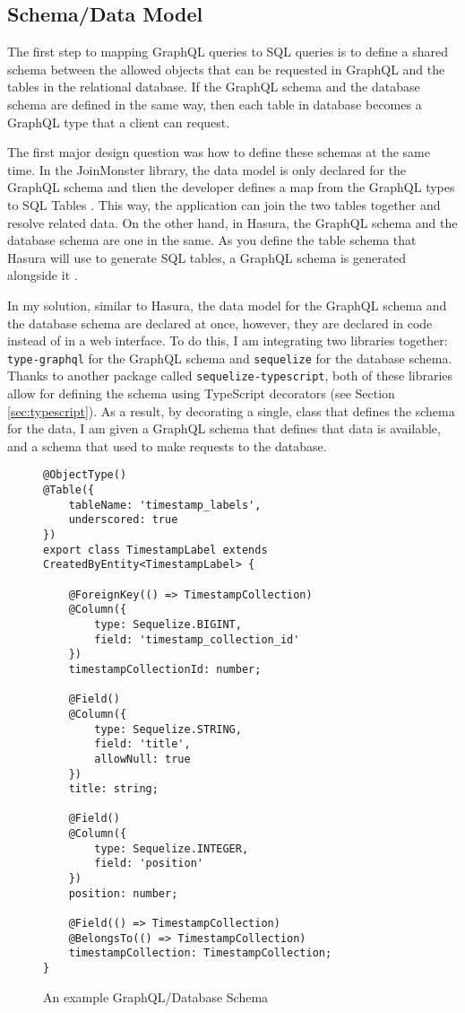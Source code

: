 \subsection{Schema/Data Model}

The first step to mapping GraphQL queries to SQL queries is to define a shared schema between the allowed objects that can be requested in GraphQL and the tables in the relational database.  If the GraphQL schema and the database schema are defined in the same way, then each table in database becomes a GraphQL type that a client can request.

The first major design question was how to define these schemas at the same time.  In the JoinMonster library, the data model is only declared for the GraphQL schema and then the developer defines a map from the GraphQL types to SQL Tables \cite{carlJoinMonster}.  This way, the application can join the two tables together and resolve related data.  On the other hand, in Hasura, the GraphQL schema and the database schema are one in the same.  As you define the table schema that Hasura will use to generate SQL tables, a GraphQL schema is generated alongside it \cite{hasurainc.HasuraGraphQLEngine}.

In my solution, similar to Hasura, the data model for the GraphQL schema and the database schema are declared at once, however, they are declared in code instead of in a web interface.  To do this, I am integrating two libraries together: \Verb!type-graphql! for the GraphQL schema and \Verb!sequelize! for the database schema.  Thanks to another package called \Verb!sequelize-typescript!, both of these libraries allow for defining the schema using TypeScript decorators (see Section \ref{sec:typescript}).  As a result, by decorating a single, class that defines the schema for the data, I am given a GraphQL schema that defines that data is available, and a schema that used to make requests to the database.

\begin{figure}
    \begin{verbatim}
@ObjectType()
@Table({
    tableName: 'timestamp_labels',
    underscored: true
})
export class TimestampLabel extends CreatedByEntity<TimestampLabel> {

    @ForeignKey(() => TimestampCollection)
    @Column({
        type: Sequelize.BIGINT,
        field: 'timestamp_collection_id'
    })
    timestampCollectionId: number;

    @Field()
    @Column({
        type: Sequelize.STRING,
        field: 'title',
        allowNull: true
    })
    title: string;

    @Field()
    @Column({
        type: Sequelize.INTEGER,
        field: 'position'
    })
    position: number;

    @Field(() => TimestampCollection)
    @BelongsTo(() => TimestampCollection)
    timestampCollection: TimestampCollection;
}
    \end{verbatim}
    \caption{An example GraphQL/Database Schema}
    \label{fig:example-entity}
\end{figure}


